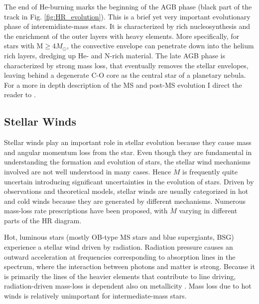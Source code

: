 The end of He-burning marks the beginning of the AGB phase (black part of the track in Fig. \ref{fig:HR_evolution}). This is a brief yet very important evolutionary phase of interemidiate-mass stars. It is characterized by rich nucleosynthesis and the enrichment of the outer layers with heavy elements. More specifically, for stars with M$ \geq 4M_{\odot}$, the convective envelope can penetrate down into the helium rich layers, dredging up He- and N-rich material. The late AGB phase is characterized by strong mass loss, that eventually removes the stellar envelopes, leaving behind a degenerate C-O core as the central star of a planetary nebula\citep{pols2011stellar}. For a more in depth description of the MS and post-MS evolution I direct the reader to \cite{pols2011stellar}.

\subsection{Stellar Winds}

Stellar winds play an important role in stellar evolution because they cause mass and angular momentum loss from the star. Even though they are fundamental in understanding the formation and evolution of stars, the stellar wind mechanisms involved are not well understood in many cases. Hence $\dot{M}$ is frequently quite uncertain introducing significant uncertainties in the evolution of stars. Driven by observations and theoretical models, stellar winds are usually categorized in hot and cold winds because they are generated by different mechanisms. Numerous mass-loss rate prescriptions have been proposed, with $\dot{M}$ varying in different parts of the HR diagram.

Hot, luminous stars (mostly OB-type MS stars and blue supergiants, BSG) experience a stellar wind driven by radiation. Radiation pressure causes an outward acceleration at frequencies corresponding to absorption lines in the spectrum, where the interaction between photons and matter is strong. Because it is primarily the lines of the heavier elements that contribute to line driving, radiation-driven mass-loss is dependent also on metallicity \citep{vink2001mass}. Mass loss due to hot winds is relatively unimportant for intermediate-mass stars.

